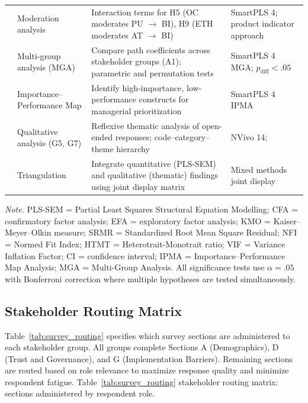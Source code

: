 {\begin{xltabular}{\textwidth}{@{} p{1.0cm} p{3.4cm} p{6.5cm} p{3.2cm} @{}}
 & Moderation analysis & Interaction terms for H5 (OC moderates PU $\rightarrow$ BI), H9 (ETH moderates AT $\rightarrow$ BI) & SmartPLS 4; product indicator approach \\
 & Multi-group analysis (MGA) & Compare path coefficients across stakeholder groups (A1); parametric and permutation tests & SmartPLS 4 MGA; $p_{\text{diff}} < .05$ \\
 & Importance--Performance Map & Identify high-importance, low-performance constructs for managerial prioritization & SmartPLS 4 IPMA \\
 & Qualitative analysis (G5, G7) & Reflexive thematic analysis of open-ended responses; code--category--theme hierarchy & NVivo 14; \cite{braun2006thematic} \\
 & Triangulation & Integrate quantitative (PLS-SEM) and qualitative (thematic) findings using joint display matrix & Mixed methods joint display \\
\end{xltabular}}
\vspace{0.5em}\noindent\textit{Note.} PLS-SEM = Partial Least Squares Structural Equation Modelling; CFA = confirmatory factor analysis; EFA = exploratory factor analysis; KMO = Kaiser--Meyer--Olkin measure; SRMR = Standardized Root Mean Square Residual; NFI = Normed Fit Index; HTMT = Heterotrait-Monotrait ratio; VIF = Variance Inflation Factor; CI = confidence interval; IPMA = Importance--Performance Map Analysis; MGA = Multi-Group Analysis. All significance tests use $\alpha = .05$ with Bonferroni correction where multiple hypotheses are tested simultaneously.

\subsection{Stakeholder Routing Matrix}
\label{subsec:survey_routing}

Table~\ref{tab:survey_routing} specifies which survey sections are administered to each stakeholder group. All groups complete Sections A (Demographics), D (Trust and Governance), and G (Implementation Barriers). Remaining sections are routed based on role relevance to maximize response quality and minimize respondent fatigue.
\noindent Table~\ref{tab:survey_routing} stakeholder routing matrix: sections administered by respondent role.

